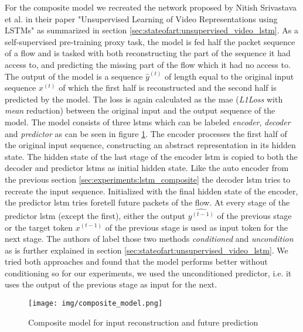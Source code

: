 For the composite model we recreated the network proposed by Nitish Srivastava et al. in their paper "Unsupervised Learning of Video Representations using LSTMs" \cite{unsupervised_learning_lstms} as summarized in section \ref{sec:stateofart:unsupervised_video_lstm}. As a self-supervised pre-training proxy task, the model is fed half the packet sequence of a flow and is tasked with both reconstructing the part of the sequence it had access to, and predicting the missing part of the flow which it had no access to. The output of the model is a sequence $\hat{y}^{(t)}$ of length equal to the original input sequence $x^{(t)}$ of which the first half is reconstructed and the second half is predicted by the model. The loss is again calculated as the \gls{mae} (\textit{L1Loss} with \textit{mean} reduction) between the original input and the output sequence of the model. The model consists of three \glspl{lstm} which can be labeled \textit{encoder}, \textit{decoder} and \textit{predictor} as can be seen in figure \ref{fig:experiments:unsupervised_lstm_composite}. The encoder processes the first half of the original input sequence, constructing an abstract representation in its hidden state. The hidden state of the last stage of the encoder \gls{lstm} is copied to both the decoder and predictor \glspl{lstm} as initial hidden state. Like the auto encoder from the previous section \ref{sec:experiments:lstm_composite} the decoder \gls{lstm} tries to recreate the input sequence. Initialized with the final hidden state of the encoder, the predictor \gls{lstm} tries foretell future packets of the flow. At every stage of the predictor \gls{lstm} (except the first), either the output $\hat{y^{(t-1)}}$ of the previous stage or the target token $x^{(t-1)}$ of the previous stage is used as input token for the next stage. The authors of \cite{unsupervised_learning_lstms} label those two methods \textit{conditioned} and \textit{uncondition} as is further explained in section \ref{sec:stateofart:unsupervised_video_lstm}. We tried both approaches and found that the model performs better without conditioning so for our experiments, we used the unconditioned predictor, i.e. it uses the output of the previous stage as input for the next. 

\begin{figure}[h]
	\centering
	\texttt{[image: img/composite\_model.png]}
	\caption{Composite model for input reconstruction and future prediction}
	\label{fig:experiments:unsupervised_lstm_composite}
\end{figure}	

